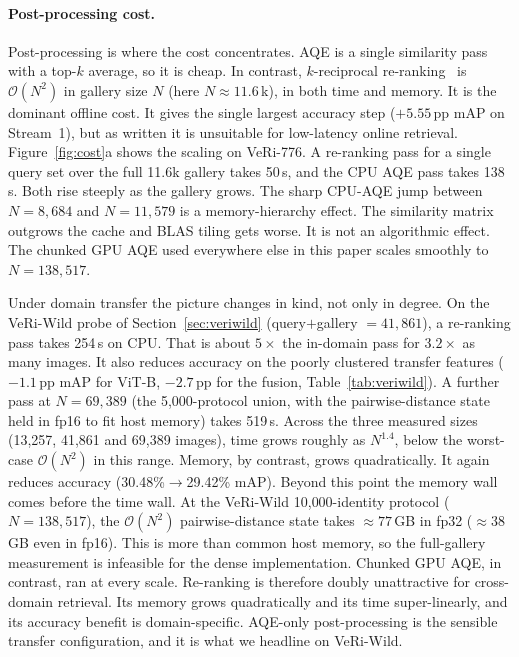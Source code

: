 \paragraph{Post-processing cost.} Post-processing is where the cost concentrates. AQE is a single similarity pass with a top-$k$ average, so it is cheap. In contrast, $k$-reciprocal re-ranking~\cite{zhong2017rerank} is $\mathcal{O}(N^{2})$ in gallery size $N$ (here $N\!\approx\!11.6$\,k), in both time and memory. It is the dominant offline cost. It gives the single largest accuracy step ($+5.55$\,pp mAP on Stream~1), but as written it is unsuitable for low-latency online retrieval. Figure~\ref{fig:cost}a shows the scaling on VeRi-776. A re-ranking pass for a single query set over the full 11.6k gallery takes 50\,s, and the CPU AQE pass takes 138\,s. Both rise steeply as the gallery grows. The sharp CPU-AQE jump between $N{=}8{,}684$ and $N{=}11{,}579$ is a memory-hierarchy effect. The similarity matrix outgrows the cache and BLAS tiling gets worse. It is not an algorithmic effect. The chunked GPU AQE used everywhere else in this paper scales smoothly to $N{=}138{,}517$.

Under domain transfer the picture changes in kind, not only in degree. On the VeRi-Wild probe of Section~\ref{sec:veriwild} (query$+$gallery $=41{,}861$), a re-ranking pass takes 254\,s on CPU. That is about $5\times$ the in-domain pass for $3.2\times$ as many images. It also reduces accuracy on the poorly clustered transfer features ($-1.1$\,pp mAP for ViT-B, $-2.7$\,pp for the fusion, Table~\ref{tab:veriwild}). A further pass at $N{=}69{,}389$ (the 5{,}000-protocol union, with the pairwise-distance state held in fp16 to fit host memory) takes 519\,s. Across the three measured sizes (13{,}257, 41{,}861 and 69{,}389 images), time grows roughly as $N^{1.4}$, below the worst-case $\mathcal{O}(N^{2})$ in this range. Memory, by contrast, grows quadratically. It again reduces accuracy (30.48\%$\rightarrow$29.42\% mAP). Beyond this point the memory wall comes before the time wall. At the VeRi-Wild 10{,}000-identity protocol ($N{=}138{,}517$), the $\mathcal{O}(N^{2})$ pairwise-distance state takes ${\approx}77$\,GB in fp32 (${\approx}38$\,GB even in fp16). This is more than common host memory, so the full-gallery measurement is infeasible for the dense implementation. Chunked GPU AQE, in contrast, ran at every scale. Re-ranking is therefore doubly unattractive for cross-domain retrieval. Its memory grows quadratically and its time super-linearly, and its accuracy benefit is domain-specific. AQE-only post-processing is the sensible transfer configuration, and it is what we headline on VeRi-Wild.
